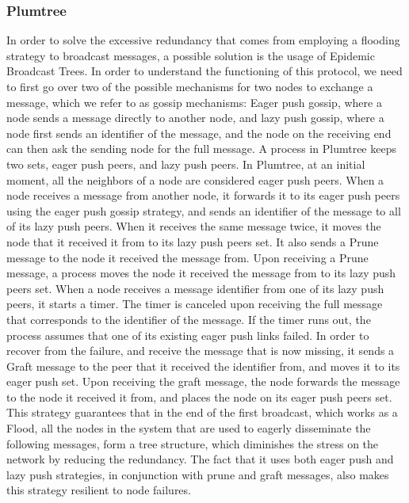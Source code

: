 \documentclass[sigconf]{acmart}
\begin{document}
\subsubsection{Plumtree}

In order to solve the excessive redundancy that comes from employing a flooding strategy to broadcast messages, a possible solution is the usage of Epidemic Broadcast Trees.
In order to understand the functioning of this protocol, we need to first go over two of the possible mechanisms for two nodes to exchange a message, which we refer to as gossip mechanisms:
Eager push gossip, where a node sends a message directly to another node, and lazy push gossip, where a node first sends an identifier of the message, and the node on the receiving end can then ask the sending node for the full message.
A process in Plumtree keeps two sets, eager push peers, and lazy push peers.
In Plumtree, at an initial moment, all the neighbors of a node are considered eager push peers. When a node receives a message from another node, it forwards it to its eager push peers using the eager push gossip strategy, and sends an identifier of the message to all of its lazy push peers. When it receives the same message twice, it moves the node that it received it from to its lazy push peers set. It also sends a Prune message to the node it received the message from. Upon receiving a Prune message, a process moves the node it received the message from to its lazy push peers set.
When a node receives a message identifier from one of its lazy push peers, it starts a timer. The timer is canceled upon receiving the full message that corresponds to the identifier of the message. If the timer runs out, the process assumes that one of its existing eager push links failed. In order to recover from the failure, and receive the message that is now missing, it sends a Graft message to the peer that it received the identifier from, and moves it to its eager push set. Upon receiving the graft message, the node forwards the message to the node it received it from, and places the node on its eager push peers set.    
This strategy guarantees that in the end of the first broadcast, which works as a Flood, all the nodes in the system that are used to eagerly disseminate the following messages, form a tree structure, which diminishes the stress on the network by reducing the redundancy.
The fact that it uses both eager push and lazy push strategies, in conjunction with prune and graft messages, also makes this strategy resilient to node failures.
\end{document}
